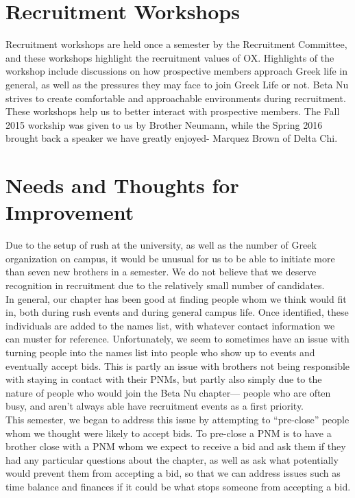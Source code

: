   \section*{Recruitment Workshops}
    Recruitment workshops are held once a semester by the Recruitment Committee, and these workshops highlight the recruitment values of OX. Highlights of the workshop include discussions on how prospective members approach Greek life in general, as well as the pressures they may face to join Greek Life or not. Beta Nu strives to create comfortable and approachable environments during recruitment. These workshops help us to better interact with prospective members. The Fall 2015 workship was given to us by Brother Neumann, while the Spring 2016 brought back a speaker we have greatly enjoyed- Marquez Brown of Delta Chi.

    
  \section*{Needs and Thoughts for Improvement}
    Due to the setup of rush at the university, as well as the number of Greek organization on campus, it would be unusual for us to be able to initiate more than seven new brothers in a semester. We do not believe that we deserve recognition in recruitment due to the relatively small number of candidates. \\
    
    In general, our chapter has been good at finding people whom we think would fit in, both during rush events and during general campus life. Once identified, these individuals are added to the names list, with whatever contact information we can muster for reference. Unfortunately, we seem to sometimes have an issue with turning people into the names list into people who show up to events and eventually accept bids. This is partly an issue with brothers not being responsible with staying in contact with their PNMs, but partly also simply due to the nature of people who would join the Beta Nu chapter— people who are often busy, and aren’t always able have recruitment events as a first priority. \\
    
    This semester, we began to address this issue by attempting to “pre-close” people whom we thought were likely to accept bids. To pre-close a PNM is to have a brother close with a PNM whom we expect to receive a bid and ask them if they had any particular questions about the chapter, as well as ask what potentially would prevent them from accepting a bid, so that we can address issues such as time balance and finances if it could be what stops someone from accepting a bid. \\
    
